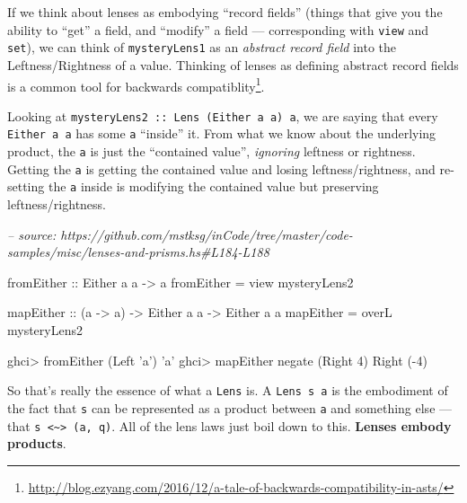 \documentclass[]{article}
\newenvironment{Shaded}{}{}
\newcommand{\CharTok}[1]{\textcolor[rgb]{0.25,0.44,0.63}{#1}}
\newcommand{\CommentTok}[1]{\textcolor[rgb]{0.38,0.63,0.69}{\textit{#1}}}
\newcommand{\DataTypeTok}[1]{\textcolor[rgb]{0.56,0.13,0.00}{#1}}
\newcommand{\DecValTok}[1]{\textcolor[rgb]{0.25,0.63,0.44}{#1}}
\newcommand{\FunctionTok}[1]{\textcolor[rgb]{0.02,0.16,0.49}{#1}}
\newcommand{\NormalTok}[1]{#1}
\newcommand{\OtherTok}[1]{\textcolor[rgb]{0.00,0.44,0.13}{#1}}
\renewcommand{\href}[2]{#2\footnote{\url{#1}}}
\begin{document}
If we think about lenses as embodying ``record fields'' (things that give you
the ability to ``get'' a field, and ``modify'' a field --- corresponding with
\texttt{view} and \texttt{set}), we can think of \texttt{mysteryLens1} as an
\emph{abstract record field} into the Leftness/Rightness of a value. Thinking of
lenses as defining abstract record fields is a
\href{http://blog.ezyang.com/2016/12/a-tale-of-backwards-compatibility-in-asts/}{common
tool for backwards compatiblity}.

Looking at \texttt{mysteryLens2\ ::\ Lens\textquotesingle{}\ (Either\ a\ a)\ a},
we are saying that every \texttt{Either\ a\ a} has some \texttt{a} ``inside''
it. From what we know about the underlying product, the \texttt{a} is just the
``contained value'', \emph{ignoring} leftness or rightness. Getting the
\texttt{a} is getting the contained value and losing leftness/rightness, and
re-setting the \texttt{a} inside is modifying the contained value but preserving
leftness/rightness.

\begin{Shaded}
\begin{Highlighting}[]
\CommentTok{-- source: https://github.com/mstksg/inCode/tree/master/code-samples/misc/lenses-and-prisms.hs#L184-L188}

\OtherTok{fromEither ::} \DataTypeTok{Either}\NormalTok{ a a }\OtherTok{->}\NormalTok{ a}
\NormalTok{fromEither }\FunctionTok{=}\NormalTok{ view mysteryLens2}

\OtherTok{mapEither ::}\NormalTok{ (a }\OtherTok{->}\NormalTok{ a) }\OtherTok{->} \DataTypeTok{Either}\NormalTok{ a a }\OtherTok{->} \DataTypeTok{Either}\NormalTok{ a a}
\NormalTok{mapEither }\FunctionTok{=}\NormalTok{ overL mysteryLens2}
\end{Highlighting}
\end{Shaded}

\begin{Shaded}
\begin{Highlighting}[]
\NormalTok{ghci}\FunctionTok{>}\NormalTok{ fromEither (}\DataTypeTok{Left} \CharTok{'a'}\NormalTok{)}
\CharTok{'a'}
\NormalTok{ghci}\FunctionTok{>}\NormalTok{ mapEither negate (}\DataTypeTok{Right} \DecValTok{4}\NormalTok{)}
\DataTypeTok{Right}\NormalTok{ (}\FunctionTok{-}\DecValTok{4}\NormalTok{)}
\end{Highlighting}
\end{Shaded}

So that's really the essence of what a \texttt{Lens\textquotesingle{}} is. A
\texttt{Lens\textquotesingle{}\ s\ a} is the embodiment of the fact that
\texttt{s} can be represented as a product between \texttt{a} and something else
--- that \texttt{s\ \textless{}\textasciitilde{}\textgreater{}\ (a,\ q)}. All of
the lens laws just boil down to this. \textbf{Lenses embody products}.
\end{document}
